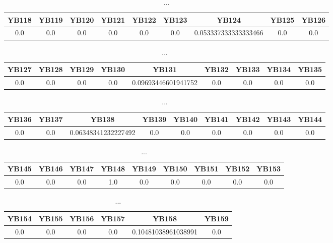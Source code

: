\documentclass[]{article}
\begin{document}
\begin{table}[h]
      \centering
      \begin{tabular}{|c|c|c|c|c|c|c|c|c|}
            \hline
            YB118 & YB119 & YB120 & YB121 & YB122 & YB123 & YB124                & YB125 & YB126 \\
            \hline
            0.0   & 0.0   & 0.0   & 0.0   & 0.0   & 0.0   & 0.053337333333333466 & 0.0   & 0.0   \\
            \hline
      \end{tabular}
      \caption{...}
\end{table}
\begin{table}[h]
      \centering
      \begin{tabular}{|c|c|c|c|c|c|c|c|c|}
            \hline
            YB127 & YB128 & YB129 & YB130 & YB131               & YB132 & YB133 & YB134 & YB135 \\
            \hline
            0.0   & 0.0   & 0.0   & 0.0   & 0.09693446601941752 & 0.0   & 0.0   & 0.0   & 0.0   \\
            \hline
      \end{tabular}
      \caption{...}
\end{table}
\begin{table}[h]
      \centering
      \begin{tabular}{|c|c|c|c|c|c|c|c|c|}
            \hline
            YB136 & YB137 & YB138               & YB139 & YB140 & YB141 & YB142 & YB143 & YB144 \\
            \hline
            0.0   & 0.0   & 0.06348341232227492 & 0.0   & 0.0   & 0.0   & 0.0   & 0.0   & 0.0   \\
            \hline
      \end{tabular}
      \caption{...}
\end{table}
\begin{table}[h]
      \centering
      \begin{tabular}{|c|c|c|c|c|c|c|c|c|}
            \hline
            YB145 & YB146 & YB147 & YB148 & YB149 & YB150 & YB151 & YB152 & YB153 \\
            \hline
            0.0   & 0.0   & 0.0   & 1.0   & 0.0   & 0.0   & 0.0   & 0.0   & 0.0   \\
            \hline
      \end{tabular}
      \caption{...}
\end{table}
\begin{table}[h]
      \centering
      \begin{tabular}{|c|c|c|c|c|c|}
            \hline
            YB154 & YB155 & YB156 & YB157 & YB158               & YB159 \\
            \hline
            0.0   & 0.0   & 0.0   & 0.0   & 0.10481038961038991 & 0.0   \\
            \hline
      \end{tabular}
      \caption{...}
\end{table}
\end{document}
